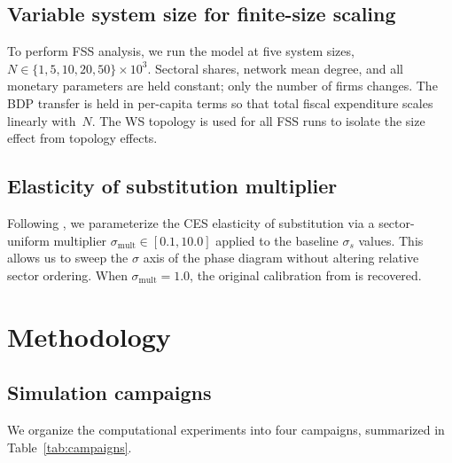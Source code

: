 \documentclass[12pt,a4paper]{article}
\begin{document}
\subsection{Variable system size for finite-size scaling}

To perform FSS analysis, we run the model at five system sizes,
$N \in \{1, 5, 10, 20, 50\} \times 10^3$. Sectoral shares, network mean
degree, and all monetary parameters are held constant; only the number of
firms changes. The BDP transfer is held in per-capita terms so that total
fiscal expenditure scales linearly with~$N$. The WS topology is used for all
FSS runs to isolate the size effect from topology effects.

\subsection{Elasticity of substitution multiplier}

Following \textcite{Maciaszek2026c}, we parameterize the CES elasticity of
substitution via a sector-uniform multiplier $\sigma_{\mathrm{mult}} \in
[0.1, 10.0]$ applied to the baseline $\sigma_s$ values. This allows us to
sweep the $\sigma$ axis of the phase diagram without altering relative
sector ordering. When $\sigma_{\mathrm{mult}} = 1.0$, the original
calibration from \textcite{Maciaszek2026a} is recovered.

\section{Methodology}
\label{sec:method}

\subsection{Simulation campaigns}

We organize the computational experiments into four campaigns, summarized in
Table~\ref{tab:campaigns}.
\end{document}
